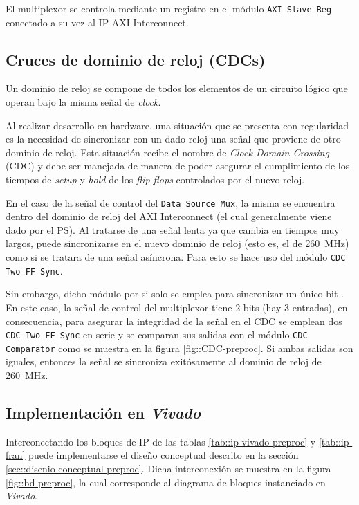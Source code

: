 \documentclass[../../main.tex]{subfiles}
\begin{document}
El multiplexor se controla mediante un registro en el módulo \texttt{AXI Slave Reg} conectado a su vez al IP AXI Interconnect.

\subsection{Cruces de dominio de reloj (CDCs)}
Un dominio de reloj se compone de todos los elementos de un circuito lógico que operan bajo la misma señal de \textit{clock}.

Al realizar desarrollo en hardware, una situación que se presenta con regularidad es la necesidad de sincronizar con un dado reloj una señal que proviene de otro dominio de reloj. Esta situación recibe el nombre de \textit{Clock Domain Crossing} (CDC) y debe ser manejada de manera de poder asegurar el cumplimiento de los tiempos de \textit{setup} y \textit{hold} de los \textit{flip-flops} controlados por el nuevo reloj.

En el caso de la señal de control del \texttt{Data Source Mux}, la misma se encuentra dentro del dominio de reloj del AXI Interconnect (el cual generalmente viene dado por el PS). Al tratarse de una señal lenta ya que cambia en tiempos muy largos, puede sincronizarse en el nuevo dominio de reloj (esto es, el de 260~MHz) como si se tratara de una señal asíncrona. Para esto se hace uso del módulo \texttt{CDC Two FF Sync}.

Sin embargo, dicho módulo por si solo se emplea para sincronizar un único bit . En este caso, la señal de control del multiplexor tiene 2 bits (hay 3 entradas), en consecuencia, para asegurar la integridad de la señal en el CDC se emplean dos \texttt{CDC Two FF Sync} en serie y se comparan sus salidas con el módulo \texttt{CDC Comparator} como se muestra en la figura \ref{fig::CDC-preproc}. Si ambas salidas son iguales, entonces la señal se sincroniza exitósamente al dominio de reloj de 260~MHz.


\subsection{Implementación en \textit{Vivado}}
Interconectando los bloques de IP de las tablas \ref{tab::ip-vivado-preproc} y \ref{tab::ip-fran} puede implementarse el diseño conceptual descrito en la sección \ref{sec::disenio-conceptual-preproc}. Dicha interconexión se muestra en la figura \ref{fig::bd-preproc}, la cual corresponde al diagrama de bloques instanciado en \textit{Vivado}. 
\end{document}
